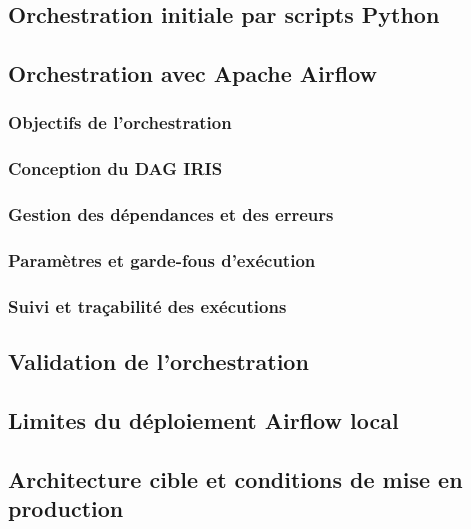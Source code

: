 
\subsection{Orchestration initiale par scripts Python}

\subsection{Orchestration avec Apache Airflow}

\subsubsection*{Objectifs de l'orchestration}
\subsubsection*{Conception du DAG IRIS}
\subsubsection*{Gestion des dépendances et des erreurs}
\subsubsection*{Paramètres et garde-fous d'exécution}
\subsubsection*{Suivi et traçabilité des exécutions}

\subsection{Validation de l'orchestration}


\subsection{Limites du déploiement Airflow local}
\subsection{Architecture cible et conditions de mise en production}
